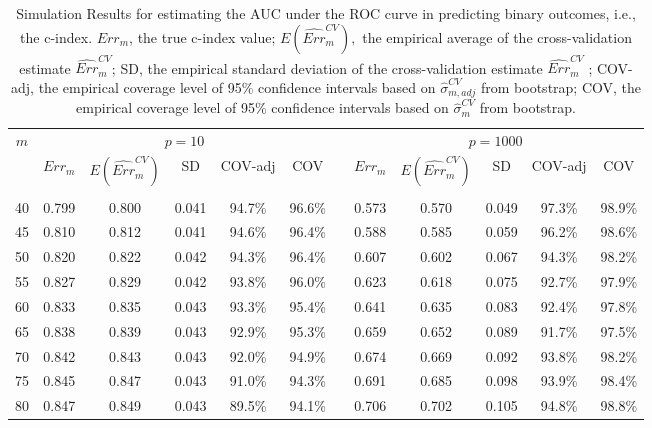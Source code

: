 \documentclass[12pt]{article}
\begin{document}


\begin{table}[ht]{
\centering
\setlength{\tabcolsep}{3pt}
\renewcommand{\arraystretch}{0.5}
\begin{tabular}{ c ccccc c ccccc }
\hline
$m$ & \multicolumn{5}{c}{$p = 10$} & & \multicolumn{5}{c}{$p = 1000$} \\
    & $Err_m$ & $E(\widehat{Err}_m^{CV})$ & SD   & COV-adj & COV && $Err_m$ & $E(\hat{Err}_m^{CV})$ & SD   & COV-adj & COV\\
    \cline{2-6} \cline{8-12}\\
40  & 0.799 & 0.800 & 0.041 & 94.7\% & 96.6\% && 0.573 & 0.570 & 0.049 & 97.3\% & 98.9\%\\
45  & 0.810 & 0.812 & 0.041 & 94.6\% & 96.4\% && 0.588 & 0.585 & 0.059 & 96.2\% & 98.6\%\\
50  & 0.820 & 0.822 & 0.042 & 94.3\% & 96.4\% && 0.607 & 0.602 & 0.067 & 94.3\% & 98.2\%\\
55  & 0.827 & 0.829 & 0.042 & 93.8\% & 96.0\% && 0.623 & 0.618 & 0.075 & 92.7\% & 97.9\% \\
60  & 0.833 & 0.835 & 0.043 & 93.3\% & 95.4\% && 0.641 & 0.635 & 0.083 & 92.4\% & 97.8\% \\
65  & 0.838 & 0.839 & 0.043 & 92.9\% & 95.3\% && 0.659 & 0.652 & 0.089 & 91.7\% & 97.5\% \\
70  & 0.842 & 0.843 & 0.043 & 92.0\% & 94.9\% && 0.674 & 0.669 & 0.092 & 93.8\% & 98.2\% \\
75  & 0.845 & 0.847 & 0.043 & 91.0\% & 94.3\% && 0.691 & 0.685 & 0.098 & 93.9\% & 98.4\% \\
80  & 0.847 & 0.849 & 0.043 & 89.5\% & 94.1\% && 0.706 & 0.702 & 0.105 & 94.8\% & 98.8\%
\end{tabular}
\caption{Simulation Results for estimating the AUC under the ROC curve in predicting binary outcomes, i.e., the c-index. $Err_m$, the true c-index value; $E(\widehat{Err}_m^{CV}),$ the empirical average of the cross-validation estimate $\widehat{Err}_m^{CV}$; SD, the empirical standard deviation of the cross-validation estimate $\widehat{Err}_m^{CV}$  ; COV-adj, the empirical coverage level of 95\% confidence intervals based on $\hat{\sigma}_{m, adj}^{CV}$ from bootstrap; COV, the empirical coverage level of 95\% confidence intervals based on $\hat{\sigma}_{m}^{CV}$ from bootstrap.}  \label{tab:simulogistic}}
\end{table} 
\end{document}
